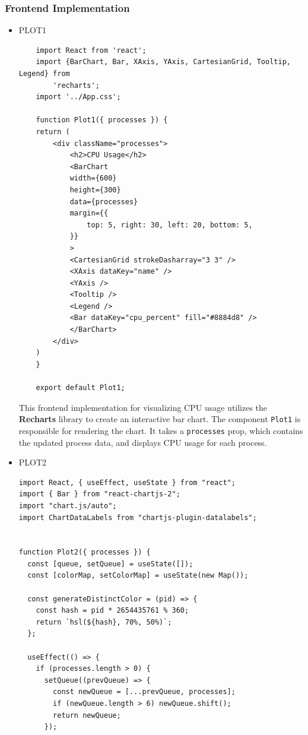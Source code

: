 \documentclass[12pt]{article}
\begin{document}
\subsubsection{Frontend Implementation}
\begin{itemize}
    \item PLOT1
    \begin{verbatim}
    import React from 'react';
    import {BarChart, Bar, XAxis, YAxis, CartesianGrid, Tooltip, Legend} from 
        'recharts';
    import '../App.css';

    function Plot1({ processes }) {
    return (
        <div className="processes">
            <h2>CPU Usage</h2>
            <BarChart
            width={600}
            height={300}
            data={processes}
            margin={{
                top: 5, right: 30, left: 20, bottom: 5,
            }}
            >
            <CartesianGrid strokeDasharray="3 3" />
            <XAxis dataKey="name" />
            <YAxis />
            <Tooltip />
            <Legend />
            <Bar dataKey="cpu_percent" fill="#8884d8" />
            </BarChart>
        </div>
    )
    }

    export default Plot1;
\end{verbatim}

This frontend implementation for visualizing CPU usage utilizes the \textbf{Recharts} library to create an interactive bar chart. The component \texttt{Plot1} is responsible for rendering the chart. It takes a \texttt{processes} prop, which contains the updated process data, and displays CPU usage for each process.



\item PLOT2
\begin{verbatim}
import React, { useEffect, useState } from "react";
import { Bar } from "react-chartjs-2";
import "chart.js/auto";
import ChartDataLabels from "chartjs-plugin-datalabels"; 


function Plot2({ processes }) {
  const [queue, setQueue] = useState([]);
  const [colorMap, setColorMap] = useState(new Map());

  const generateDistinctColor = (pid) => {
    const hash = pid * 2654435761 % 360; 
    return `hsl(${hash}, 70%, 50%)`;
  };

  useEffect(() => {
    if (processes.length > 0) {
      setQueue((prevQueue) => {
        const newQueue = [...prevQueue, processes];
        if (newQueue.length > 6) newQueue.shift();
        return newQueue;
      });


\end{verbatim}
\end{itemize}
\end{document}
